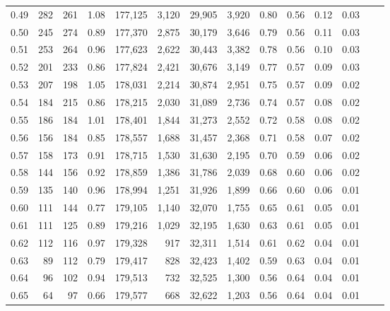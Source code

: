 \begin{tabular}{rrrrrrrrrrrrrr}
0.49 &     282 &    261 &    1.08 &  177,125 &    3,120 &  29,905 &   3,920 &  0.80 &  0.56 &  0.12 &      0.03 \\
0.50 &     245 &    274 &    0.89 &  177,370 &    2,875 &  30,179 &   3,646 &  0.79 &  0.56 &  0.11 &      0.03 \\
0.51 &     253 &    264 &    0.96 &  177,623 &    2,622 &  30,443 &   3,382 &  0.78 &  0.56 &  0.10 &      0.03 \\
0.52 &     201 &    233 &    0.86 &  177,824 &    2,421 &  30,676 &   3,149 &  0.77 &  0.57 &  0.09 &      0.03 \\
0.53 &     207 &    198 &    1.05 &  178,031 &    2,214 &  30,874 &   2,951 &  0.75 &  0.57 &  0.09 &      0.02 \\
0.54 &     184 &    215 &    0.86 &  178,215 &    2,030 &  31,089 &   2,736 &  0.74 &  0.57 &  0.08 &      0.02 \\
0.55 &     186 &    184 &    1.01 &  178,401 &    1,844 &  31,273 &   2,552 &  0.72 &  0.58 &  0.08 &      0.02 \\
0.56 &     156 &    184 &    0.85 &  178,557 &    1,688 &  31,457 &   2,368 &  0.71 &  0.58 &  0.07 &      0.02 \\
0.57 &     158 &    173 &    0.91 &  178,715 &    1,530 &  31,630 &   2,195 &  0.70 &  0.59 &  0.06 &      0.02 \\
0.58 &     144 &    156 &    0.92 &  178,859 &    1,386 &  31,786 &   2,039 &  0.68 &  0.60 &  0.06 &      0.02 \\
0.59 &     135 &    140 &    0.96 &  178,994 &    1,251 &  31,926 &   1,899 &  0.66 &  0.60 &  0.06 &      0.01 \\
0.60 &     111 &    144 &    0.77 &  179,105 &    1,140 &  32,070 &   1,755 &  0.65 &  0.61 &  0.05 &      0.01 \\
0.61 &     111 &    125 &    0.89 &  179,216 &    1,029 &  32,195 &   1,630 &  0.63 &  0.61 &  0.05 &      0.01 \\
0.62 &     112 &    116 &    0.97 &  179,328 &      917 &  32,311 &   1,514 &  0.61 &  0.62 &  0.04 &      0.01 \\
0.63 &      89 &    112 &    0.79 &  179,417 &      828 &  32,423 &   1,402 &  0.59 &  0.63 &  0.04 &      0.01 \\
0.64 &      96 &    102 &    0.94 &  179,513 &      732 &  32,525 &   1,300 &  0.56 &  0.64 &  0.04 &      0.01 \\
0.65 &      64 &     97 &    0.66 &  179,577 &      668 &  32,622 &   1,203 &  0.56 &  0.64 &  0.04 &      0.01 \\

\end{tabular}
